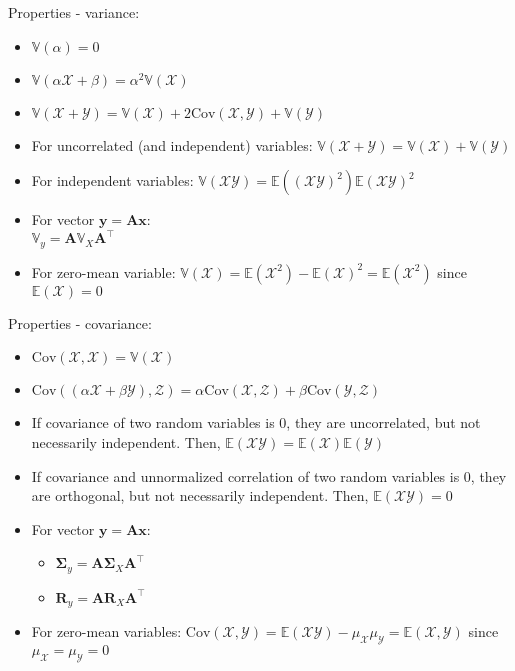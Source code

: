 Properties - variance:
\begin{multicols}{2}
\begin{itemize}
    \item $\mathbb{V}(\alpha)=0$
    \item $\mathbb{V}(\alpha\mathcal{X}+\beta)=\alpha^2\mathbb{V}(\mathcal{X})$
    \item $\mathbb{V}(\mathcal{X} + \mathcal{Y})=\mathbb{V}(\mathcal{X})+2\textrm{Cov}(\mathcal{X},\mathcal{Y})+\mathbb{V}(\mathcal{Y})$
    \item For uncorrelated (and independent) variables: $\mathbb{V}(\mathcal{X} + \mathcal{Y})=\mathbb{V}(\mathcal{X})+\mathbb{V}(\mathcal{Y})$
    \item For independent variables: $\mathbb{V}(\mathcal{X}\mathcal{Y})=\mathbb{E}((\mathcal{X}\mathcal{Y})^2)\mathbb{E}(\mathcal{X}\mathcal{Y})^2$
    \item For vector $\boldsymbol{y} = \boldsymbol{A}\boldsymbol{x}$:\\ $\mathbb{V}_y = \boldsymbol{A}\mathbb{V}_X\boldsymbol{A}^\intercal$
    \item For zero-mean variable: $\mathbb{V}(\mathcal{X})= \mathbb{E}(\mathcal{X}^2) - \mathbb{E}(\mathcal{X})^2 = \mathbb{E}(\mathcal{X}^2)$ since $\mathbb{E}(\mathcal{X}) = 0$
\end{itemize}
\end{multicols}
Properties - covariance:
\begin{itemize}
    \item $\textrm{Cov}(\mathcal{X},\mathcal{X}) = \mathbb{V}(\mathcal{X})$
    \item $\textrm{Cov}((\alpha \mathcal{X} + \beta \mathcal{Y}),\mathcal{Z}) = \alpha \textrm{Cov}(\mathcal{X},\mathcal{Z}) + \beta \textrm{Cov}(\mathcal{Y},\mathcal{Z})$
    \item If covariance of two random variables is 0, they are uncorrelated, but not necessarily independent. Then, $\mathbb{E}(\mathcal{X}\mathcal{Y})=\mathbb{E}(\mathcal{X})\mathbb{E}(\mathcal{Y})$
    \item If covariance and unnormalized correlation of two random variables is 0, they are orthogonal, but not necessarily independent. Then, $\mathbb{E}(\mathcal{X}\mathcal{Y}) = 0$
    \item For vector $\boldsymbol{y} = \boldsymbol{A}\boldsymbol{x}$:
        \begin{itemize}
            \item $\boldsymbol{\Sigma}_y = \boldsymbol{A}\boldsymbol{\Sigma}_X\boldsymbol{A}^\intercal$
            \item $\boldsymbol{R}_y = \boldsymbol{A}\boldsymbol{R}_X\boldsymbol{A}^\intercal$
        \end{itemize}
    \item For zero-mean variables: $\textrm{Cov}(\mathcal{X},\mathcal{Y})= \mathbb{E}(\mathcal{X}\mathcal{Y}) - \mu_{\mathcal{X}} \mu_{\mathcal{Y}} = \mathbb{E}(\mathcal{X},\mathcal{Y})$ since $\mu_{\mathcal{X}} = \mu_{\mathcal{Y}} = 0$
\end{itemize}
